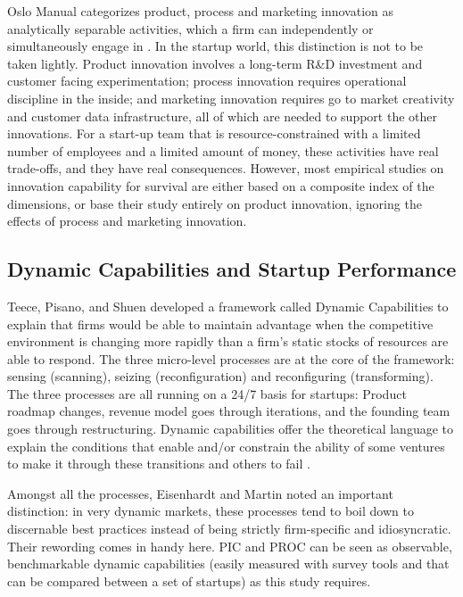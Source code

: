 \documentclass{ieeeaccess}
\begin{document}
Oslo Manual categorizes product, process and marketing innovation as analytically separable activities, which a firm can independently or simultaneously engage in \cite{b3}. In the startup world, this distinction is not to be taken lightly. Product innovation involves a long-term R\&D investment and customer facing experimentation; process innovation requires operational discipline in the inside; and marketing innovation requires go to market creativity and customer data infrastructure, all of which are needed to support the other innovations. For a start-up team that is resource-constrained with a limited number of employees and a limited amount of money, these activities have real trade-offs, and they have real consequences. However, most empirical studies on innovation capability for survival are either based on a composite index of the dimensions, or base their study entirely on product innovation, ignoring the effects of process and marketing innovation.

\subsection{Dynamic Capabilities and Startup Performance}

Teece, Pisano, and Shuen \cite{b10} developed a framework called Dynamic Capabilities to explain that firms would be able to maintain advantage when the competitive environment is changing more rapidly than a firm's static stocks of resources are able to respond. The three micro-level processes are at the core of the framework: sensing (scanning), seizing (reconfiguration) and reconfiguring (transforming). The three processes are all running on a 24/7 basis for startups: Product roadmap changes, revenue model goes through iterations, and the founding team goes through restructuring. Dynamic capabilities offer the theoretical language to explain the conditions that enable and/or constrain the ability of some ventures to make it through these transitions and others to fail \cite{b13}.

Amongst all the processes, Eisenhardt and Martin \cite{b14} noted an important distinction: in very dynamic markets, these processes tend to boil down to discernable best practices instead of being strictly firm-specific and idiosyncratic. Their rewording comes in handy here. PIC and PROC can be seen as observable, benchmarkable dynamic capabilities (easily measured with survey tools and that can be compared between a set of startups) as this study requires.
\end{document}
